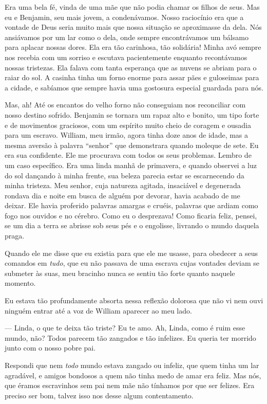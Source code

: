 Era uma bela fé, vinda de uma mãe que
não podia chamar os filhos de seus. Mas eu e Benjamin, seu mais jovem, a
condenávamos. Nosso raciocínio era que a vontade de Deus seria muito
mais que nossa situação se aproximasse da dela. Nós ansiávamos por um
lar como o dela, onde sempre encontrávamos um bálsamo para aplacar
nossas dores. Ela era tão carinhosa, tão solidária! Minha avó sempre nos
recebia com um sorriso e escutava pacientemente enquanto recontávamos
nossas tristezas. Ela falava com tanta esperança que as nuvens se abriam
para o raiar do sol. A casinha tinha um forno enorme para assar pães e
guloseimas para a cidade, e sabíamos que sempre havia uma gostosura
especial guardada para nós.

Mas, ah! Até os encantos do velho forno
não conseguiam nos reconciliar com nosso destino sofrido. Benjamin se
tornara um rapaz alto e bonito, um tipo forte e de movimentos graciosos,
com um espírito muito cheio de coragem e ousadia para um escravo.
William, meu irmão, agora tinha doze anos de idade, mas a mesma aversão
à palavra ``senhor'' que demonstrara quando moleque de sete. Eu era sua
confidente. Ele me procurava com todos os seus problemas. Lembro de um
caso específico. Era uma linda manhã de primavera, e quando observei a
luz do sol dançando à minha frente, sua beleza parecia estar se
escarnecendo da minha tristeza. Meu senhor, cuja natureza agitada,
insaciável e degenerada rondava dia e noite em busca de alguém por
devorar, havia acabado de me deixar. Ele havia proferido palavras
amargas e cruéis, palavras que ardiam como fogo nos ouvidos e no
cérebro. Como eu o desprezava! Como ficaria feliz, pensei, se um dia a
terra se abrisse sob seus pés e o engolisse, livrando o mundo daquela
praga.

Quando ele me disse que eu existia para
que ele me usasse, para obedecer a seus comandos em \emph{tudo}, que eu
não passava de uma escrava cujas vontades deviam se submeter às suas,
meu bracinho nunca se sentiu tão forte quanto naquele momento.

Eu estava tão profundamente absorta
nessa reflexão dolorosa que não vi nem ouvi ninguém entrar até a voz de
William aparecer ao meu lado.

--- Linda, o que te deixa tão triste? Eu te amo. Ah, Linda, como é ruim
esse mundo, não? Todos parecem tão zangados e tão infelizes. Eu queria
ter morrido junto com o nosso pobre pai.

Respondi que nem \emph{todo} mundo
estava zangado ou infeliz, que quem tinha um lar agradável, e amigos
bondosos a quem não tinha medo de amar era feliz. Mas nós, que éramos
escravinhos sem pai nem mãe não tínhamos por que ser felizes. Era
preciso ser bom, talvez isso nos desse algum contentamento.

